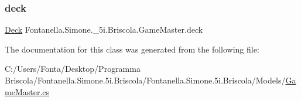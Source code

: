 \subsubsection{\texorpdfstring{deck}{deck}}
{\footnotesize\ttfamily \hyperlink{class_fontanella_1_1_simone_1_1__5i_1_1_briscola_1_1_deck}{Deck} Fontanella.\+Simone.\+\_\+5i.\+Briscola.\+Game\+Master.\+deck\hspace{0.3cm}{\ttfamily [get]}}



The documentation for this class was generated from the following file\+:\begin{DoxyCompactItemize}
\item 
C\+:/\+Users/\+Fonta/\+Desktop/\+Programma Briscola/\+Fontanella.\+Simone.\+5i.\+Briscola/\+Fontanella.\+Simone.\+5i.\+Briscola/\+Models/\hyperlink{_game_master_8cs}{Game\+Master.\+cs}\end{DoxyCompactItemize}
